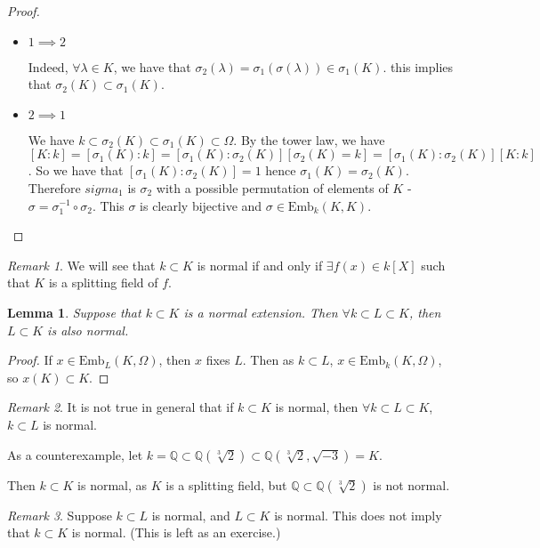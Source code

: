 \documentclass{article}
\theoremstyle{definition}
\theoremstyle{plain}%
\newtheorem{lem}[thm]{Lemma}
\theoremstyle{remark}
\newtheorem*{rem}{Remark}
\newcommand{\Q}{\mathbb{Q}}
\newcommand{\Emb}{\text{Emb}}
\begin{document}
\begin{proof}
\hspace{0.1em}
\begin{itemize}
    \item $1 \implies 2$
    
    Indeed, $\forall \lambda \in K$, we have that $\sigma_2(\lambda) = \sigma_1(\sigma(\lambda)) \in \sigma_1(K)$. this implies that $\sigma_2(K) \subset \sigma_1(K)$.
    \item $2 \implies 1$
    
    We have $k \subset \sigma_2(K) \subset \sigma_1(K) \subset \Omega$. By the tower law, we have $[K : k] = [\sigma_1(K) : k] = [\sigma_1(K) : \sigma_2(K)][\sigma_2(K) = k] = [\sigma_1(K) : \sigma_2(K)][K : k]$. So we have that $[\sigma_1(K) : \sigma_2(K)] = 1$ hence $\sigma_1(K) = \sigma_2(K)$. Therefore $sigma_1$ is $\sigma_2$ with a possible permutation of elements of $K$ - $\sigma = \sigma_1^{-1} \circ \sigma_2$. This $\sigma$ is clearly bijective and $\sigma \in \Emb_k(K,K)$.
\end{itemize}
\end{proof}

\begin{rem}
We will see that $k \subset K$ is normal if and only if $\exists f(x) \in k[X]$ such that $K$ is a splitting field of $f$.
\end{rem}

\begin{lem}
Suppose that $k \subset K$ is a normal extension. Then $\forall k \subset L \subset K$, then $L \subset K$ is also normal.
\end{lem}

\begin{proof}
  If $x \in \Emb_L(K, \Omega)$, then $x$ fixes $L$. Then as $k \subset L$, $x \in \Emb_k(K, \Omega)$, so $x(K) \subset K$.
\end{proof}

\begin{rem}
    It is not true in general that if $k \subset K$ is normal, then $\forall k \subset L \subset K$, $k \subset L$ is normal.
    
    As a counterexample, let $k = \Q \subset \Q(\sqrt[3]{2}) \subset \Q(\sqrt[3]{2}, \sqrt{-3}) = K$.
    
    Then $k \subset K$ is normal, as $K$ is a splitting field, but $\Q \subset \Q(\sqrt[3]{2})$ is not normal.
\end{rem}

\begin{rem}
    Suppose $k \subset L$ is normal, and $L \subset K$ is normal. This does not imply that $k \subset K$ is normal. (This is left as an exercise.)
\end{rem}
\end{document}

